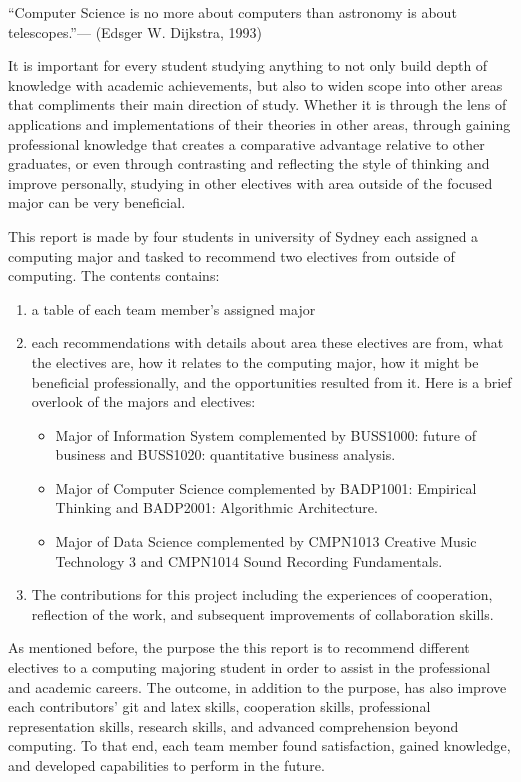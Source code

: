 \documentclass{article}
\begin{document}
	\begin{displayquote}
	“Computer Science is no more about computers than astronomy is about telescopes.”— (Edsger W. Dijkstra, 1993)
	\end{displayquote}
	It is important for every student studying anything to not only build depth of knowledge with academic achievements, but also to widen scope into other areas that compliments their main direction of study. Whether it is through the 	lens of applications and implementations of their theories in other areas, through gaining professional knowledge that creates a comparative advantage relative to other graduates, or even through contrasting and reflecting the style of thinking and improve personally, studying in other electives with area outside of the focused major can be very beneficial.\par
	This report is made by four students in university of Sydney each assigned a computing major and tasked to recommend two electives from outside of computing. The contents contains:
	\begin{enumerate}
		\item a table of each team member’s assigned major
		\item each recommendations with details about area these electives are from, what the electives are, how it relates to the computing major, how it might be beneficial professionally, and the opportunities resulted from it. Here is a brief overlook of the majors and electives:
		\begin{itemize}
			\item Major of Information System complemented by BUSS1000: future of business and BUSS1020: quantitative business analysis.
			\item Major of Computer Science complemented by BADP1001: Empirical Thinking and BADP2001: Algorithmic Architecture.
			\item Major of Data Science complemented by CMPN1013 Creative Music Technology 3 and CMPN1014 Sound Recording Fundamentals.
		\end{itemize}
		\item The contributions for this project including the experiences of cooperation, reflection of the work, and subsequent improvements of collaboration skills.
	\end{enumerate}
	As mentioned before, the purpose the this report is to recommend different electives to a computing majoring student in order to assist in the professional and academic careers. The outcome, in addition to the purpose, has also improve each contributors’ git and latex skills, cooperation skills, professional representation skills, research skills, and  advanced comprehension beyond computing. To that end, each team member found satisfaction, gained knowledge, and developed capabilities to perform in the future.
\end{document}
